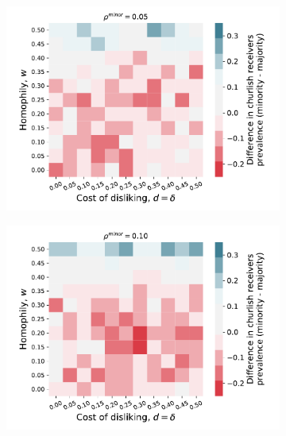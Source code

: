 \documentclass[11pt,letterpaper]{article}
\begin{document}
\begin{appendices}
\begin{figure}[H]
  \centering
  \begin{subfigure}{0.48\textwidth}
    \centering
    \includegraphics[width=\textwidth]{Figures/churlish_receivers_diff_0p05.pdf}
  \end{subfigure}
  \hfill
  \begin{subfigure}{0.48\textwidth}
    \centering
    \includegraphics[width=\textwidth]{Figures/churlish_receivers_diff_0p10.pdf}
  \end{subfigure} \\[.25in]

\end{figure}
\end{appendices}
\end{document}

